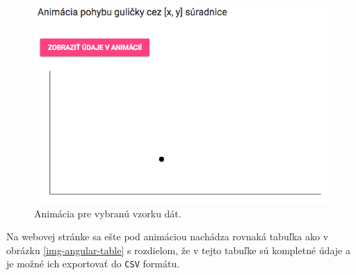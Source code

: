 \begin{figure}[H]
  \centering
  \includegraphics[scale=0.5]{img/code/angular-fulldata-animation.png}
  \caption{Animácia pre vybranú vzorku dát.}
  \label{img-angular-fulldata-graph}
\end{figure}

Na webovej stránke sa ešte pod animáciou nachádza rovnaká tabuľka ako v obrázku \ref{img-angular-table} s rozdielom, že v tejto tabuľke sú kompletné údaje a je možné ich exportovať do \verb|CSV| formátu.


